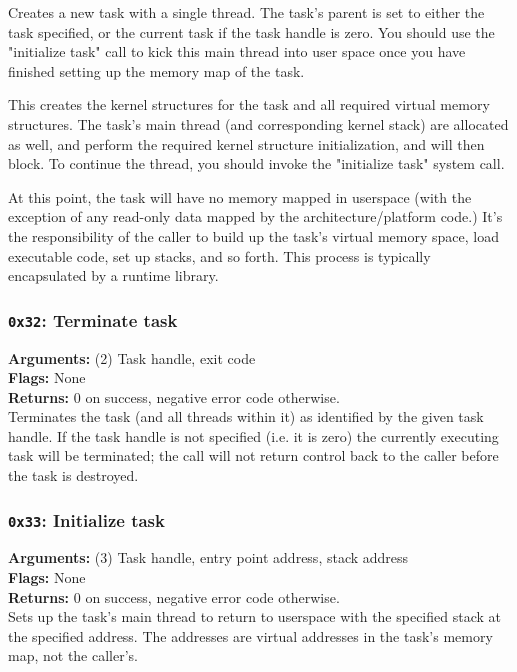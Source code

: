 \documentclass[11pt]{article}
\begin{document}
Creates a new task with a single thread. The task's parent is set to either the task specified, or the current task if the task handle is zero. You should use the "initialize task" call to kick this main thread into user space once you have finished setting up the memory map of the task.

This creates the kernel structures for the task and all required virtual memory structures. The task's main thread (and corresponding kernel stack) are allocated as well, and perform the required kernel structure initialization, and will then block. To continue the thread, you should invoke the "initialize task" system call.

At this point, the task will have no memory mapped in userspace (with the exception of any read-only data mapped by the architecture/platform code.) It's the responsibility of the caller to build up the task's virtual memory space, load executable code, set up stacks, and so forth. This process is typically encapsulated by a runtime library.

\subsubsection{{\tt 0x32}: Terminate task}
\textbf{Arguments:} (2) Task handle, exit code \\
\textbf{Flags:} None \\
\textbf{Returns:} 0 on success, negative error code otherwise. \\

Terminates the task (and all threads within it) as identified by the given task handle. If the task handle is not specified (i.e. it is zero) the currently executing task will be terminated; the call will not return control back to the caller before the task is destroyed.

\subsubsection{{\tt 0x33}: Initialize task}
\textbf{Arguments:} (3) Task handle, entry point address, stack address \\
\textbf{Flags:} None \\
\textbf{Returns:} 0 on success, negative error code otherwise. \\

Sets up the task's main thread to return to userspace with the specified stack at the specified address. The addresses are virtual addresses in the task's memory map, not the caller's.
\end{document}

